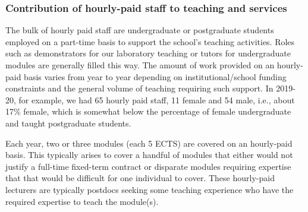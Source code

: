 \subsubsection{Contribution of hourly-paid staff to teaching and services}

The bulk of hourly paid staff are undergraduate or postgraduate students
employed on a part-time basis to support the school's teaching activities. 
Roles such as demonstrators for our laboratory teaching or tutors for
undergraduate modules are generally filled this way. The amount of work
provided on an hourly-paid basis varies from year to year depending
on institutional/school funding constraints and the general volume
of teaching requiring such support. In 2019-20, for example,
we had 65 hourly paid staff, 11 female and 54 male, i.e., about 
17\% female, which is somewhat below the percentage of female  
undergraduate and taught postgraduate  students.

Each year, two or three modules (each 5 ECTS)
are covered on an hourly-paid basis. This typically arises
to cover a handful of modules that either would not justify a 
full-time fixed-term contract or disparate modules requiring 
expertise that that would be difficult for one individual to 
cover. These hourly-paid lecturers are typically 
postdocs seeking some teaching experience who have the required 
expertise to teach the module(s).


\newcommand{\actdeptsurvey}{Deleted}
\newcommand{\actdeptmarketing}{Amended}
\newcommand{\actdeptrolemodels}{Amended}
\newcommand{\actdeptfunds}{Deleted}
\newcommand{\actdeptcareerchoice}{Amended}
\newcommand{\actdeptpromisingfemale}{Amended}
\newcommand{\actdeptringfence}{Deleted}
\newcommand{\actdepthighlight}{Amended}
\newcommand{\actdeptseminar}{Deleted}
\newcommand{\actdeptinternships}{Amended}



